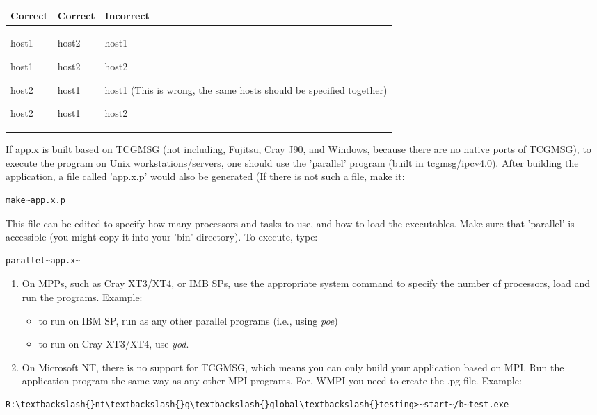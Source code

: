 \begin{tabular}{|>{\centering}p{2cm}|>{\centering}p{2cm}|>{\raggedright}p{3cm}|}
\hline 
Correct & Correct & Incorrect\tabularnewline
\hline
\hline 
host1

host1

host2

host2 & host2

host2

host1

host1 & host1

host2

host1 (This is wrong, the same hosts should be specified together)

host2\tabularnewline
\hline
\end{tabular}

If app.x is built based on TCGMSG (not including, Fujitsu, Cray J90,
and Windows, because there are no native ports of TCGMSG), to execute
the program on Unix workstations/servers, one should use the 'parallel'
program (built in tcgmsg/ipcv4.0). After building the application,
a file called 'app.x.p' would also be generated (If there is not such
a file, make it: 
\begin{verbatim}
make~app.x.p
\end{verbatim}
This file can be edited to specify how many processors and tasks to
use, and how to load the executables. Make sure that 'parallel' is
accessible (you might copy it into your 'bin' directory). To execute,
type:
\begin{verbatim}
parallel~app.x~\end{verbatim}
\begin{enumerate}
\item On MPPs, such as Cray XT3/XT4, or IMB SPs, use the appropriate system
command to specify the number of processors, load and run the programs.
Example: 

\begin{itemize}
\item to run on IBM SP, run as any other parallel programs (i.e., using
\emph{poe}) 
\item to run on Cray XT3/XT4, use \emph{yod}.
\end{itemize}
\item On Microsoft NT, there is no support for TCGMSG, which means you can
only build your application based on MPI. Run the application program
the same way as any other MPI programs. For, WMPI you need to create
the .pg file. Example: \end{enumerate}
\begin{verbatim}
R:\textbackslash{}nt\textbackslash{}g\textbackslash{}global\textbackslash{}testing>~start~/b~test.exe
\end{verbatim}

